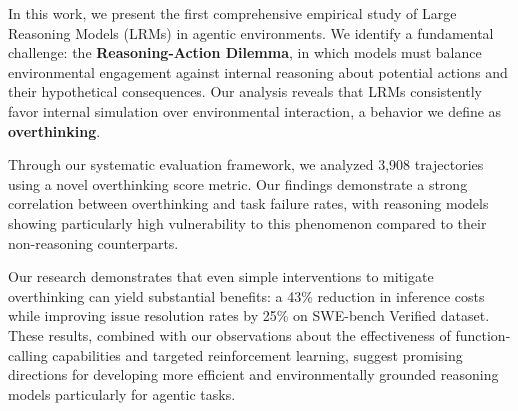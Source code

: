 
In this work, we present the first comprehensive empirical study of Large Reasoning Models (LRMs) in agentic environments. We identify a fundamental challenge: the \textbf{Reasoning-Action Dilemma}, in which models must balance environmental engagement against internal reasoning about potential actions and their hypothetical consequences. Our analysis reveals that LRMs consistently favor internal simulation over environmental interaction, a behavior we define as \textbf{overthinking}.

Through our systematic evaluation framework, we analyzed 3,908 trajectories using a novel overthinking score metric. Our findings demonstrate a strong correlation between overthinking and task failure rates, with reasoning models showing particularly high vulnerability to this phenomenon compared to their non-reasoning counterparts.

Our research demonstrates that even simple interventions to mitigate overthinking can yield substantial benefits: a 43\% reduction in inference costs while improving issue resolution rates by 25\% on SWE-bench Verified dataset. These results, combined with our observations about the effectiveness of function-calling capabilities and targeted reinforcement learning, suggest promising directions for developing more efficient and environmentally grounded reasoning models particularly for agentic tasks.

